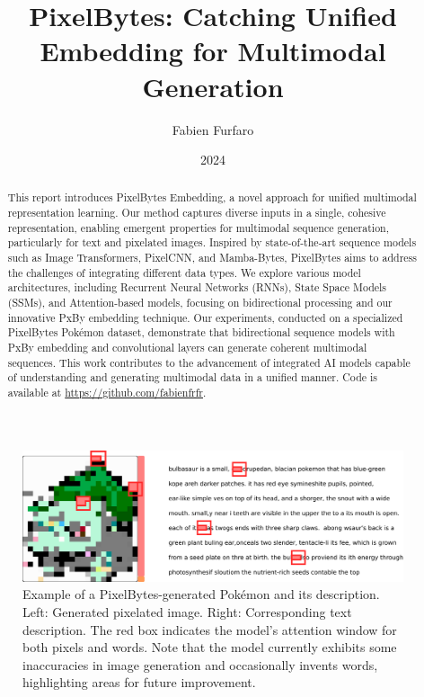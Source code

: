 \documentclass[10pt,a4paper]{article}
\title{\Large\textbf{PixelBytes: Catching Unified Embedding for Multimodal Generation}}
\author{\large Fabien Furfaro}
\date{\large 2024}
\begin{document}
\maketitle


\begin{abstract}
This report introduces PixelBytes Embedding, a novel approach for unified multimodal representation learning. Our method captures diverse inputs in a single, cohesive representation, enabling emergent properties for multimodal sequence generation, particularly for text and pixelated images. Inspired by state-of-the-art sequence models such as Image Transformers, PixelCNN, and Mamba-Bytes, PixelBytes aims to address the challenges of integrating different data types. We explore various model architectures, including Recurrent Neural Networks (RNNs), State Space Models (SSMs), and Attention-based models, focusing on bidirectional processing and our innovative PxBy embedding technique. Our experiments, conducted on a specialized PixelBytes Pokémon dataset, demonstrate that bidirectional sequence models with PxBy embedding and convolutional layers can generate coherent multimodal sequences. This work contributes to the advancement of integrated AI models capable of understanding and generating multimodal data in a unified manner. Code is available at \url{https://github.com/fabienfrfr}.
\end{abstract}

\let\thefootnote\relax{}


\begin{figure}[h]
\centering
\includegraphics[width=0.8\linewidth]{example_generation.png}
\caption{Example of a PixelBytes-generated Pokémon and its description. Left: Generated pixelated image. Right: Corresponding text description. The red box indicates the model's attention window for both pixels and words. Note that the model currently exhibits some inaccuracies in image generation and occasionally invents words, highlighting areas for future improvement.}
\label{fig:example_generation}
\end{figure}
\end{document}
